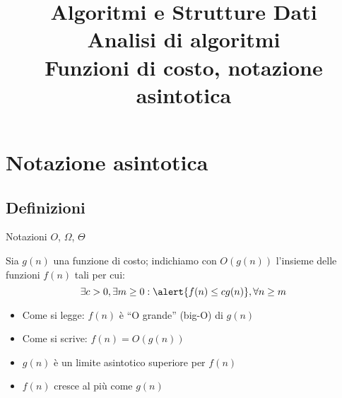 \title[ASD - Analisi di algoritmi]{\textbf{Algoritmi e Strutture Dati}\\[18pt]Analisi di algoritmi\\Funzioni di costo, notazione asintotica}


\FrameTitle{}


\section{Notazione asintotica}

\subsection{Definizioni}

\begin{frame}{Notazioni $O$, $\Omega$, $\Theta$}

\vspace{-9pt}
\begin{myboxtitle}
Sia $g(n)$ una funzione di costo; indichiamo con $O(g(n))$ l'insieme
delle funzioni $f(n)$ tali per cui:\\[-6pt]
\[
  \exists c>0, \exists m \geq 0: \alert{f(n) \leq cg(n)}, \forall n \geq m
\]
\end{myboxtitle}

\medskip
\begin{itemize}
\item Come si legge: $f(n)$ è “\alert{O grande}” (big-O) di $g(n)$
\item Come si scrive: $f(n) = O(g(n))$
\item $g(n)$ è un \alert{limite asintotico superiore} per $f(n)$
\item $f(n)$ cresce al più come $g(n)$
\end{itemize}

\end{frame}

